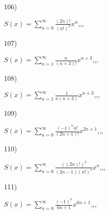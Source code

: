 \documentclass[11pt, ukrainian]{article}
\begin{document}
\vspace{0.9cm}
106) \space 
{%
{$S(x)=\sum\limits_{n=0}^{\infty}{\frac{(2n)!}{(n!)^2}}{x^{n}}$},,, \par \smallskip  
}
\par
\vspace{0.9cm}
107) \space 
{%
{$S(x)=\sum\limits_{n=1}^{\infty}{\frac{n}{(n+3)!}}{x^{{n+3}}}$},,, \par \smallskip  
}
\par
\vspace{0.9cm}
108) \space 
{%
{$S(x)=\sum\limits_{n=1}^{\infty}{\frac{1}{n(n+3)}}{x^{{n+3}}}$},,, \par \smallskip  
}
\par
\vspace{0.9cm}
109) \space 
{%
{$S(x)=\sum\limits_{n=0}^{\infty}{\frac{{(-1)^n}{n!}}{(2n+1)!}}{x^{{2n+1}}}$},,, \par \smallskip  
}
\par
\vspace{0.9cm}
110) \space 
{%
{$S(x)=\sum\limits_{n=0}^{\infty}{\frac{((2n)!)^2}{(2n-1)(n!)^4}}{x^{{n}}}$},,, \par \smallskip  
}
\par
\newpage
111) \space 
{%
{$S(x)=\sum\limits_{n=0}^{\infty}{\frac{(-1)^n}{6n+1}}{x^{{6n+1}}}$},,, \par \smallskip  
}
\end{document}
